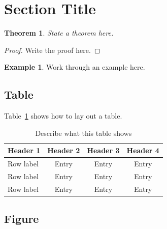 \documentclass[12pt]{article}
\theoremstyle{definition}
\newtheorem{example}[definition]{Example}
\theoremstyle{plain}
\newtheorem{theorem}[definition]{Theorem}
\begin{document}
\section{Section Title}

\begin{theorem}
  State a theorem here.
\end{theorem}

\begin{proof}
  Write the proof here.
\end{proof}

\begin{example}
  Work through an example here.
\end{example}

\subsection{Table}

Table~\ref{tab:placeholder} shows how to lay out a table.

\begin{table}[htbp]
  \centering
  \caption{Describe what this table shows}
  \label{tab:placeholder}
  \begin{tabular}{lccc}
    \toprule
    Header 1 & Header 2 & Header 3 & Header 4 \\
    \midrule
    Row label & Entry & Entry & Entry \\
    Row label & Entry & Entry & Entry \\
    Row label & Entry & Entry & Entry \\
    \bottomrule
  \end{tabular}
\end{table}

\subsection{Figure}
\end{document}
